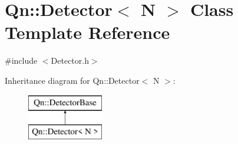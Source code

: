 \hypertarget{classQn_1_1Detector}{}\section{Qn\+:\+:Detector$<$ N $>$ Class Template Reference}
\label{classQn_1_1Detector}


{\ttfamily \#include $<$Detector.\+h$>$}

Inheritance diagram for Qn\+:\+:Detector$<$ N $>$\+:\begin{figure}[H]
\begin{center}
\leavevmode
\includegraphics[height=2.000000cm]{classQn_1_1Detector}
\end{center}
\end{figure}
